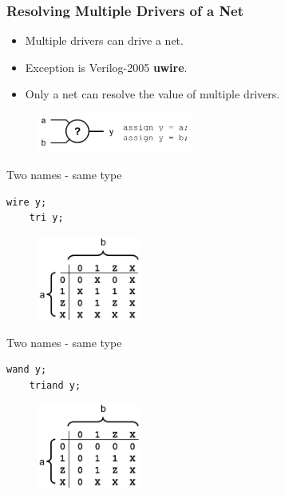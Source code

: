 \documentclass[t, notes, xcolor=table]{beamer}
\begin{document}
\begin{frame}[fragile]
\frametitle{Resolving Multiple Drivers of a Net}

\scriptsize{
\begin{multicols}{2}
\begin{itemize}
\item Multiple drivers can drive a net.
\item Exception is Verilog-2005 \textbf{uwire}.
\item Only a net can resolve the value of multiple drivers.
\end{itemize}

\vfill
\columnbreak
\begin{figure}
    \includegraphics[width=0.45\textwidth]{img/04_multiple.png}
\end{figure}
\end{multicols}
\vfill
\begin{multicols}{3}
Two names - same type
\begin{Verbatim}[commandchars=\\\{\}, tabsize=4]
	wire y;
	tri y;
\end{Verbatim}
\vfill
\begin{figure}
    \includegraphics[width=0.3\textwidth]{img/04_multiple0.png}
\end{figure}

\vfill
\columnbreak
Two names - same type
\begin{Verbatim}[commandchars=\\\{\}, tabsize=4]
	wand y;
	triand y;
\end{Verbatim}
\vfill
\begin{figure}
    \includegraphics[width=0.3\textwidth]{img/04_multiple1.png}
\end{figure}


\end{multicols}}
\end{frame}
\end{document}
